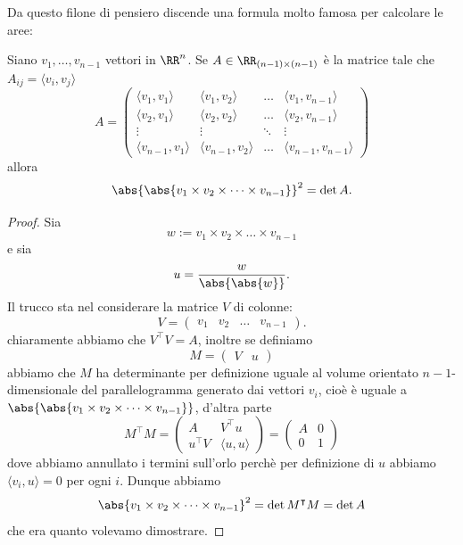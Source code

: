 \documentclass[11pt]{scrartcl}
\begin{document}
   	 Da questo filone di pensiero discende una formula molto famosa per calcolare le aree:
   	 \begin{theorem}
   	 	Siano $v_1,\dots,v_{n-1}$ vettori in $\RR^n$. Se $A\in \RR_{(n-1)\times (n-1)}$ è la matrice tale che $A_{ij}=\langle v_i,v_j\rangle$
   	 	$$A=
   	 	\begin{pmatrix}
   	 		\langle v_1, v_1 \rangle & \langle v_1,v_2\rangle & \dots & \langle v_1,v_{n-1} \rangle \\
   	 		\langle v_2, v_1 \rangle & \langle v_2,v_2\rangle & \dots & \langle v_2,v_{n-1} \rangle \\
   	 		\vdots & \vdots & \ddots & \vdots \\
   	 		\langle v_{n-1}, v_1 \rangle & \langle v_{n-1}, v_2\rangle & \dots & \langle v_{n-1},v_{n-1} \rangle
   	 	\end{pmatrix}
   	 	$$
   	 	allora 
   	 	$$\abs{\abs{v_1\times v_2 \times \dots \times v_{n-1}}}^2=\det A.$$
   	 \end{theorem}
   	 \begin{proof}
   	 	Sia 
   	 	$$w:=v_1\times v_2 \times \dots \times v_{n-1}$$
   	 	e sia
   	 	$$u=\frac{w}{\abs{\abs{w}}}.$$
   	 	Il trucco sta nel considerare la matrice $V$ di colonne:
   	 	$$V=\left(
   	 	\begin{array}{c|c|c|c}
   	 		v_1 & v_2 & \dots & v_{n-1} 
   	 	\end{array}
   	 	\right).$$
   	 	chiaramente abbiamo che $V^\intercal V= A$, inoltre se definiamo 
   	 	$$M=\left(
   	 	\begin{array}{c|c}
   	 		V & u
   	 	\end{array}
   	 	\right)$$
   	 	abbiamo che $M$ ha determinante per definizione uguale al volume orientato $n-1$-dimensionale del parallelogramma generato dai vettori $v_i$, cioè è uguale a $\abs{\abs{v_1\times v_2 \times \dots \times v_{n-1}}}$, d'altra parte
   	 	$$M^\intercal M=\left(
   	 	\begin{array}{c|c}
   	 		A & V^\intercal u \\
   	 		\hline
   	 		u^\intercal V & \langle u,u\rangle
   	 	\end{array}
   	 	\right)=\left(
   	 	\begin{array}{c|c}
   	 		A & 0 \\
   	 		\hline
   	 		0 & 1
   	 	\end{array}
   	 	\right)$$
   	 	dove abbiamo annullato i termini sull'orlo perchè per definizione di $u$ abbiamo $\langle v_i,u\rangle=0$ per ogni $i$. Dunque abbiamo
   	 	$$\abs{{v_1\times v_2\times \dots \times v_{n-1}}}^2=\det M^\intercal M=\det A$$
   	 	che era quanto volevamo dimostrare.
   	 \end{proof}
\end{document}
